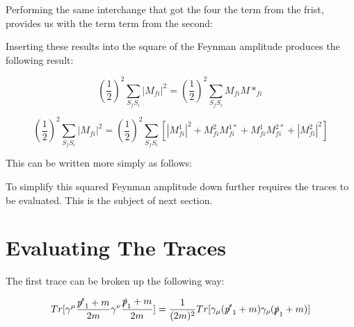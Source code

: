 \documentclass[a4]{article}
\begin{document}
    Performing the same interchange that got the four the term from the frist, provides us with the term term from the second:

    \begin{center}
    \end{center}

    Inserting these results into the square of the Feynman amplitude produces the following result:

    \begin{equation}
        (\frac{1}{2})^2 \sum_{S_f S_i} |M_{f i}|^2 = (\frac{1}{2})^2 \sum_{S_f S_i} M_{fi} M*_{fi}
    \end{equation}

    \begin{equation}
        (\frac{1}{2})^2 \sum_{S_f S_i} |M_{f i}|^2 = (\frac{1}{2})^2 \sum_{S_f S_i} [|M_{f i}^1|^2+M_{fi}^2 M_{fi}^{1*} + M_{fi}^1 M_{fi}^{2*} + |M_{f i}^2|^2]
    \end{equation}

    This can be written more simply as follows:

    \begin{center}
    \end{center}

    To simplify this squared Feynman amplitude down further requires the traces to be evaluated. This is the subject of next section.

    \section*{Evaluating The Traces}

    The first trace can be broken up the following way:

    \begin{equation}
        Tr [\gamma^\mu \frac{\slashed{p'}_1 + m}{2m} \gamma^\nu \frac{\slashed{p}_1 + m}{2 m}] = \frac{1}{(2m)^2} Tr[\gamma_\mu (\slashed{p'}_1 + m) \gamma_\rho (\slashed{p}_1 + m)]
    \end{equation}
\end{document}
